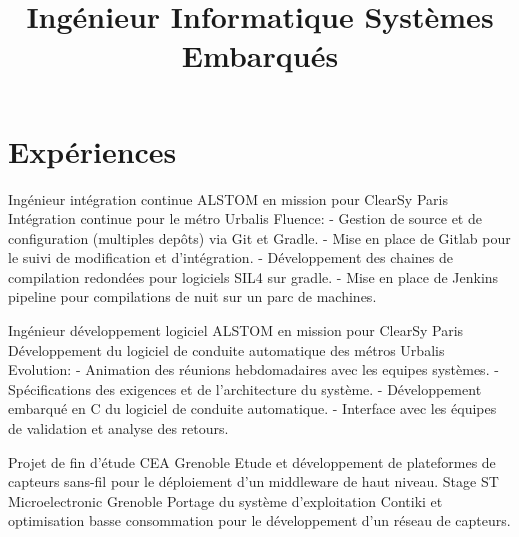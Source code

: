 \documentclass[10pt,a4paper]{moderncv}
\title{\large Ingénieur Informatique Systèmes Embarqués}
\begin{document}
\maketitle

\section{Expériences}

  {Ingénieur intégration continue}
  {ALSTOM en mission pour ClearSy}
  {}
  {Paris}
  {Intégration continue pour le métro Urbalis Fluence:\newline{}
  - Gestion de source et de configuration (multiples depôts) via Git et Gradle.\newline{}
  - Mise en place de Gitlab pour le suivi de modification et d'intégration.\newline{}
  - Développement des chaines de compilation redondées pour logiciels SIL4 sur gradle.\newline{}
  - Mise en place de Jenkins pipeline pour compilations de nuit sur un parc de machines.\newline{}}

  {Ingénieur développement logiciel}
  {ALSTOM en mission pour ClearSy}
  {}
  {Paris}
  {Développement du logiciel de conduite automatique des métros Urbalis Evolution:\newline{}
  - Animation des réunions hebdomadaires avec les equipes systèmes.\newline{}
  - Spécifications des exigences et de l'architecture du système.\newline{}
  - Développement embarqué en C du logiciel de conduite automatique.\newline{}
  - Interface avec les équipes de validation et analyse des retours.\newline{}}

  {Projet de fin d'étude}
  {CEA}
  {}
  {Grenoble}
  {Etude et développement de plateformes de capteurs sans-fil pour le déploiement d'un middleware de haut niveau.\newline{}}
  {Stage}
  {ST Microelectronic}
  {}
  {Grenoble}
  {Portage du système d'exploitation Contiki et optimisation basse consommation pour le développement d'un réseau de capteurs.\newline{}}
  
\end{document}
